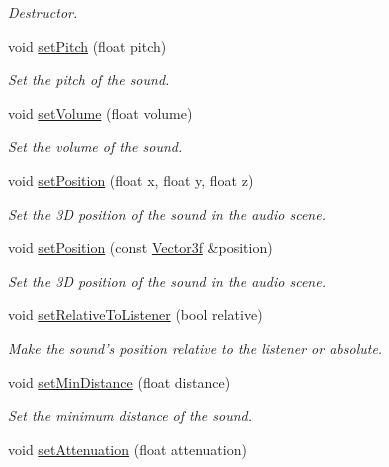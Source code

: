 \begin{DoxyCompactItemize}
\begin{DoxyCompactList}\small\item\em Destructor. \end{DoxyCompactList}\item 
void \hyperlink{classsf_1_1SoundSource_a72a13695ed48b7f7b55e7cd4431f4bb6}{set\-Pitch} (float pitch)
\begin{DoxyCompactList}\small\item\em Set the pitch of the sound. \end{DoxyCompactList}\item 
void \hyperlink{classsf_1_1SoundSource_a2f192f2b49fb8e2b82f3498d3663fcc2}{set\-Volume} (float volume)
\begin{DoxyCompactList}\small\item\em Set the volume of the sound. \end{DoxyCompactList}\item 
void \hyperlink{classsf_1_1SoundSource_a0480257ea25d986eba6cc3c1a6f8d7c2}{set\-Position} (float x, float y, float z)
\begin{DoxyCompactList}\small\item\em Set the 3\-D position of the sound in the audio scene. \end{DoxyCompactList}\item 
void \hyperlink{classsf_1_1SoundSource_a17ba9ed01925395652181a7b2a7d3aef}{set\-Position} (const \hyperlink{classsf_1_1Vector3}{Vector3f} \&position)
\begin{DoxyCompactList}\small\item\em Set the 3\-D position of the sound in the audio scene. \end{DoxyCompactList}\item 
void \hyperlink{classsf_1_1SoundSource_ac478a8b813faf7dd575635b102081d0d}{set\-Relative\-To\-Listener} (bool relative)
\begin{DoxyCompactList}\small\item\em Make the sound's position relative to the listener or absolute. \end{DoxyCompactList}\item 
void \hyperlink{classsf_1_1SoundSource_a75bbc2c34addc8b25a14edb908508afe}{set\-Min\-Distance} (float distance)
\begin{DoxyCompactList}\small\item\em Set the minimum distance of the sound. \end{DoxyCompactList}\item 
void \hyperlink{classsf_1_1SoundSource_aa2adff44cd2f8b4e3c7315d7c2a45626}{set\-Attenuation} (float attenuation)

\end{DoxyCompactItemize}
